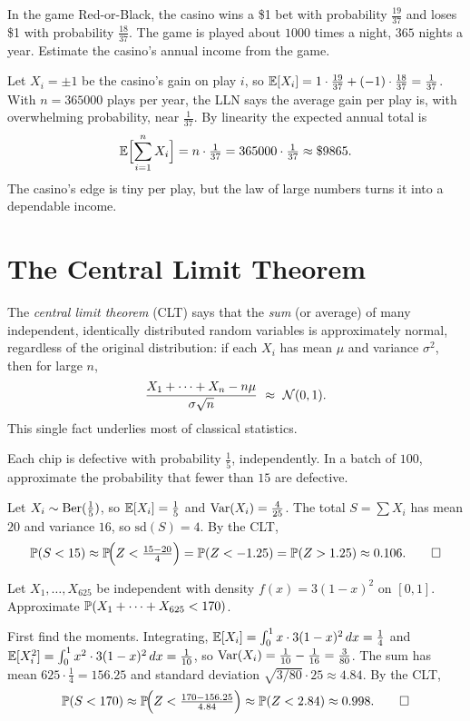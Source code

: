 \begin{example}
In the game Red-or-Black, the casino wins a \$1 bet with probability
$\tfrac{19}{37}$ and loses \$1 with probability $\tfrac{18}{37}$. The game is
played about $1000$ times a night, $365$ nights a year. Estimate the casino's
annual income from the game.

\solution Let $X_i=\pm 1$ be the casino's gain on play $i$, so
$\mathbb{E}[X_i]=1\cdot\tfrac{19}{37}+(-1)\cdot\tfrac{18}{37}=\tfrac1{37}$. With
$n=365000$ plays per year, the LLN says the average gain per play is, with
overwhelming probability, near $\tfrac1{37}$. By linearity the expected annual
total is
\[
  \mathbb{E}\Bigl[\sum_{i=1}^{n}X_i\Bigr]=n\cdot\tfrac1{37}=365000\cdot\tfrac1{37}\approx \$9865.
\]
The casino's edge is tiny per play, but the law of large numbers turns it into a
dependable income.
\end{example}

\section{The Central Limit Theorem}

The \emph{central limit theorem} (CLT) says that the \emph{sum} (or average) of
many independent, identically distributed random variables is approximately
normal, regardless of the original distribution: if each $X_i$ has mean $\mu$ and
variance $\sigma^2$, then for large $n$,
\[
  \frac{X_1+\cdots+X_n-n\mu}{\sigma\sqrt n}\ \approx\ \N(0,1).
\]
This single fact underlies most of classical statistics.

\begin{example}
Each chip is defective with probability $\tfrac15$, independently. In a batch of
$100$, approximate the probability that fewer than $15$ are defective.

\solution Let $X_i\sim\mathrm{Ber}(\tfrac15)$, so $\mathbb{E}[X_i]=\tfrac15$ and
$\mathrm{Var}(X_i)=\tfrac{4}{25}$. The total $S=\sum X_i$ has mean $20$ and variance
$16$, so $\mathrm{sd}(S)=4$. By the CLT,
\[
  \mathbb{P}(S<15)\approx\mathbb{P}\!\Bigl(Z<\tfrac{15-20}{4}\Bigr)=\mathbb{P}(Z<-1.25)=\mathbb{P}(Z>1.25)\approx 0.106. \qedhere
\]
\end{example}

\begin{example}
Let $X_1,\dots,X_{625}$ be independent with density $f(x)=3(1-x)^2$ on $[0,1]$.
Approximate $\mathbb{P}(X_1+\cdots+X_{625}<170)$.

\solution First find the moments. Integrating,
$\mathbb{E}[X_i]=\int_0^1 x\cdot 3(1-x)^2\,dx=\tfrac14$ and
$\mathbb{E}[X_i^2]=\int_0^1 x^2\cdot 3(1-x)^2\,dx=\tfrac1{10}$, so
$\mathrm{Var}(X_i)=\tfrac1{10}-\tfrac1{16}=\tfrac3{80}$. The sum has mean
$625\cdot\tfrac14=156.25$ and standard deviation
$\sqrt{3/80}\cdot 25\approx 4.84$. By the CLT,
\[
  \mathbb{P}(S<170)\approx\mathbb{P}\!\Bigl(Z<\tfrac{170-156.25}{4.84}\Bigr)\approx\mathbb{P}(Z<2.84)\approx 0.998. \qedhere
\]
\end{example}

